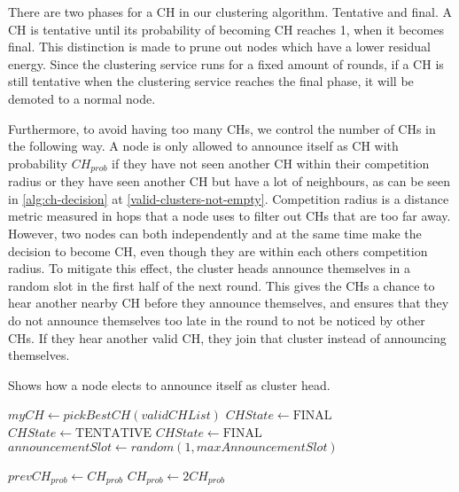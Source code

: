 There are two phases for a CH in our clustering algorithm. Tentative and final. A CH is tentative until its probability of becoming CH reaches 1, when it becomes final. This distinction is made to prune out nodes which have a lower residual energy. Since the clustering service runs for a fixed amount of rounds, if a CH is still tentative when the clustering service reaches the final phase, it will be demoted to a normal node. 

Furthermore, to avoid having too many CHs, we control the number of CHs in the following way. A node is only allowed to announce itself as CH with probability $CH_{prob}$ if they have not seen another CH within their competition radius or they have seen another CH but have a lot of neighbours, as can be seen in \cref{alg:ch-decision} at \cref{valid-clusters-not-empty}. Competition radius is a distance metric measured in hops that a node uses to filter out CHs that are too far away. However, two nodes can both independently and at the same time make the decision to become CH, even though they are within each others competition radius. To mitigate this effect, the cluster heads announce themselves in a random slot in the first half of the next round. This gives the CHs a chance to hear another nearby CH before they announce themselves, and ensures that they do not announce themselves too late in the round to not be noticed by other CHs. If they hear another valid CH, they join that cluster instead of announcing themselves.

\begin{algorithm}[bt]
\caption{Shows how a node elects to announce itself as cluster head.}
\label{alg:ch-decision}
\begin{algorithmic}[1]
     \label{valid-clusters-not-empty}
        \State $myCH \gets pickBestCH(validCHList)$
                \State $CHState \gets \text{FINAL}$
            \Else
                \State $CHState \gets \text{TENTATIVE}$
            \EndIf
        \EndIf
        \State $CHState \gets \text{FINAL}$
        \State $announcementSlot \gets random(1, maxAnnouncementSlot)$
    \EndIf
    
    \State $prevCH_{prob} \gets CH_{prob}$
    \State $CH_{prob} \gets 2CH_{prob}$
\EndIf
\EndProcedure
\end{algorithmic}
\end{algorithm}

